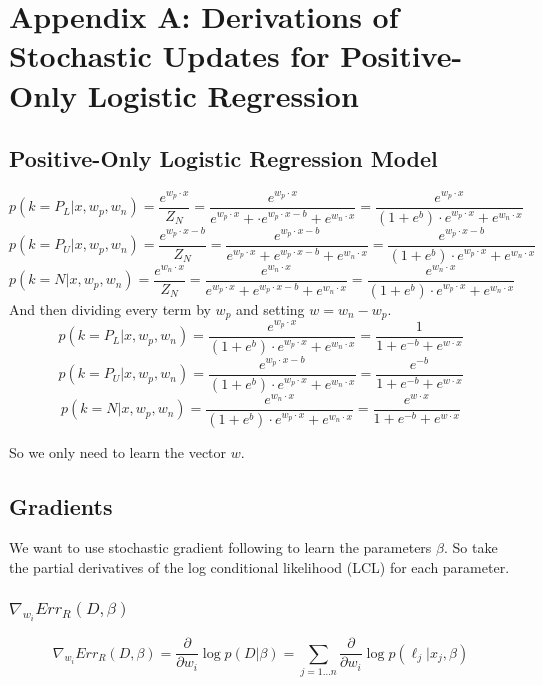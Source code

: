 \documentclass{article}
\begin{document}
\onecolumn

\section{Appendix A: Derivations of Stochastic Updates for Positive-Only Logistic Regression}

\subsection{Positive-Only Logistic Regression Model}
$$
p(k=P_L | x, w_p, w_n) =  \frac{e^{w_p \cdot x}}{Z_N} = \frac{e^{w_p \cdot x}}{e^{w_p \cdot x} + \cdot e^{w_p \cdot x - b} + e^{w_n \cdot x}} = \frac{e^{w_p \cdot x}}{(1 + e^{b}) \cdot e^{w_p \cdot x} + e^{w_n \cdot x}}
$$
$$
p(k=P_U | x, w_p, w_n) =  \frac{e^{w_p \cdot x - b}}{Z_N} = \frac{e^{w_p \cdot x - b}}{e^{w_p \cdot x} + e^{w_p \cdot x - b} + e^{w_n \cdot x}} = \frac{e^{w_p \cdot x - b}}{(1 + e^{b}) \cdot e^{w_p \cdot x} + e^{w_n \cdot x}}
$$
$$
p(k=N | x, w_p, w_n) =  \frac{e^{w_n \cdot x}}{Z_N} = \frac{e^{w_n \cdot x}}{e^{w_p \cdot x} + e^{w_p \cdot x - b} + e^{w_n \cdot x}} = \frac{e^{w_n \cdot x}}{(1 + e^{b}) \cdot e^{w_p \cdot x} + e^{w_n \cdot x}}
$$
And then dividing every term by $w_p$ and setting $w = w_n - w_p$.
$$
p(k=P_L | x, w_p, w_n) = \frac{e^{w_p \cdot x}}{(1 + e^{b}) \cdot e^{w_p \cdot x} + e^{w_n \cdot x}} = \frac{1}{1 + e^{-b} + e^{w \cdot x}}
$$
$$
p(k=P_U | x, w_p, w_n) = \frac{e^{w_p \cdot x - b}}{(1 + e^{b}) \cdot e^{w_p \cdot x} + e^{w_n \cdot x}} = \frac{e^{-b}}{1 + e^{-b} + e^{w \cdot x}}
$$
$$
p(k=N | x, w_p, w_n) = \frac{e^{w_n \cdot x}}{(1 + e^{b}) \cdot e^{w_p \cdot x} + e^{w_n \cdot x}} = \frac{e^{w \cdot x}}{1 + e^{-b} + e^{w \cdot x}}
$$

So we only need to learn the vector $w$.

\subsection{Gradients}

We want to use stochastic gradient following to learn the parameters $\beta$. So take the partial derivatives of the log conditional likelihood (LCL) for each parameter.

\subsubsection{$ \nabla_{w_i}{Err_R (D, \beta)}$}

$$
\nabla_{w_i}{Err_R (D, \beta)} = \frac{\partial}{\partial w_i} \log{p(D|\beta)} =  \sum_{j=1...n}{\frac{\partial}{\partial w_i}\log{p(\ell_j | x_j, \beta)}}
$$
\end{document}
